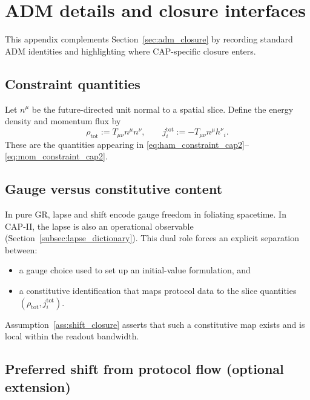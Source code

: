 \section{ADM details and closure interfaces}
\label{app:adm_details}

This appendix complements Section~\ref{sec:adm_closure} by recording standard ADM identities and highlighting where CAP-specific closure enters.

\subsection{Constraint quantities}
\label{app:adm_constraints}

Let $n^\mu$ be the future-directed unit normal to a spatial slice.
Define the energy density and momentum flux by
\begin{equation}
  \rho_{\mathrm{tot}} := T_{\mu\nu}n^\mu n^\nu,
  \qquad
  j_i^{\mathrm{tot}} := -T_{\mu\nu}n^\mu h^\nu{}_i.
\end{equation}
These are the quantities appearing in \eqref{eq:ham_constraint_cap2}--\eqref{eq:mom_constraint_cap2}.

\subsection{Gauge versus constitutive content}
\label{app:adm_gauge_constitutive}

In pure GR, lapse and shift encode gauge freedom in foliating spacetime.
In CAP-II, the lapse is also an operational observable (Section~\ref{subsec:lapse_dictionary}).
This dual role forces an explicit separation between:
\begin{itemize}
  \item a gauge choice used to set up an initial-value formulation, and
  \item a constitutive identification that maps protocol data to the slice quantities $(\rho_{\mathrm{tot}},j_i^{\mathrm{tot}})$.
\end{itemize}
Assumption~\ref{ass:shift_closure} asserts that such a constitutive map exists and is local within the readout bandwidth.

\subsection{Preferred shift from protocol flow (optional extension)}
\label{app:preferred_shift_protocol_flow}

